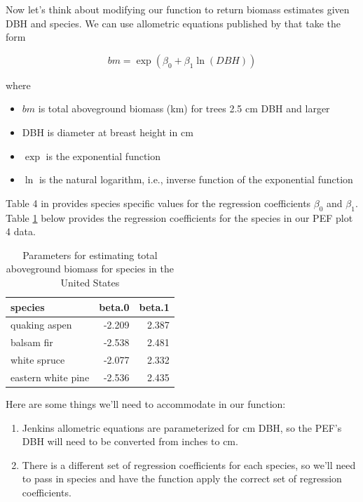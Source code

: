 \documentclass[]{krantz}
\providecommand{\tightlist}{%
  \setlength{\itemsep}{0pt}\setlength{\parskip}{0pt}}
\begin{document}
Now let's think about modifying our function to return biomass estimates given DBH and species. We can use allometric equations published by \citet{jenkins03} that take the form

\begin{equation}
  bm = \exp(\beta_0 + \beta_1 \ln(DBH))
  \label{eq:jenkBio}
\end{equation}

where

\begin{itemize}
\tightlist
\item
  \(bm\) is total aboveground biomass (km) for trees 2.5 cm DBH and larger
\item
  DBH is diameter at breast height in cm
\item
  \(\exp\) is the exponential function
\item
  \(\ln\) is the natural logarithm, i.e., inverse function of the exponential function
\end{itemize}

Table 4 in \citet{jenkins03} provides species specific values for the regression coefficients \(\beta_0\) and \(\beta_1\). Table \ref{tab:jenks} below provides the regression coefficients for the species in our PEF plot 4 data.

\begin{table}[t]

\caption{\label{tab:jenks}Parameters for estimating total aboveground biomass for species in the United States}
\centering
\begin{tabular}{lrr}
\toprule
species & beta.0 & beta.1\\
\midrule
quaking aspen & -2.209 & 2.387\\
balsam fir & -2.538 & 2.481\\
white spruce & -2.077 & 2.332\\
eastern white pine & -2.536 & 2.435\\
\bottomrule
\end{tabular}
\end{table}

Here are some things we'll need to accommodate in our function:

\begin{enumerate}
\def\labelenumi{\arabic{enumi}.}
\tightlist
\item
  Jenkins allometric equations are parameterized for cm DBH, so the PEF's DBH will need to be converted from inches to cm.
\item
  There is a different set of regression coefficients for each species, so we'll need to pass in species and have the function apply the correct set of regression coefficients.
\end{enumerate}
\end{document}
